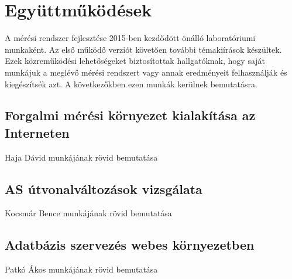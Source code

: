 \chapter{Együttműködések}

A mérési rendszer fejlesztése 2015-ben kezdődött önálló laboratóriumi munkaként. Az első működő verziót követően további témakiírások készültek. Ezek közreműködési lehetőségeket biztosítottak hallgatóknak, hogy saját munkájuk a meglévő mérési rendszert vagy annak eredményeit felhasználják és kiegészítsék azt. A következőkben ezen munkák kerülnek bemutatásra. 

\section{Forgalmi mérési környezet kialakítása az Interneten}
Haja Dávid munkájának rövid bemutatása

\section{AS útvonalváltozások vizsgálata}
Kocsmár Bence munkájának rövid bemutatása

\section{Adatbázis szervezés webes környezetben}
Patkó Ákos munkájának rövid bemutatása